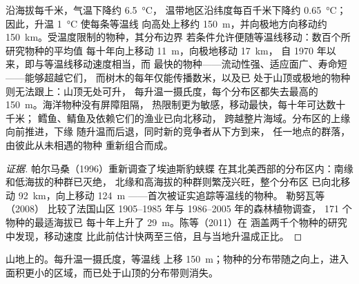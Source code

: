 \begin{proposition}\label{prop:b2:global-change:range}
沿海拔每千米，气温下降约 \qty{6.5}{\celsius}，
温带地区沿纬度每百千米下降约 \qty{0.65}{\celsius}；
因此，升温 \qty{1}{\celsius} 使每条等温线
向高处上移约 \qty{150}{m}，并向极地方向移动约
\qty{150}{km}。受温度限制的物种，其分布边界
若条件允许便随等温线移动：数百个所研究物种的平均值
每十年向上移动 \qty{11}{m}，向极地移动 \qty{17}{km}，
自 1970 年以来，即与等温线移动速度相当，而
最快的物种——流动性强、适应面广、寿命短——能够超越它们，
而树木的每年仅能传播数米，以及已
处于山顶或极地的物种则无法跟上：山顶无处可升，
每升温一摄氏度，每个分布区都失去最高的
\qty{150}{m}。海洋物种没有屏障阻隔，
热限制更为敏感，移动最快，每十年可达数十千米；
鳕鱼、鲭鱼及依赖它们的渔业已向北移动，
跨越整片海域。分布区的上缘向前推进，下缘
随升温而后退，同时新的竞争者从下方到来，
任一地点的群落，由彼此从未相遇的物种
重新组合而成。
\end{proposition}
\begin{proof}[证据]
帕尔马桑（1996）重新调查了埃迪斯豹蛱蝶
在其北美西部的分布区内：南缘和低海拔的种群已灭绝，
北缘和高海拔的种群则繁茂兴旺，整个分布区
已向北移动 \qty{92}{km}，向上移动 \qty{124}{m}
——首次被证实追踪等温线的物种。
勒努瓦等（2008）
比较了法国山区 1905--1985 年与 1986--2005 年的森林植物调查，
171 个物种的最适海拔已
每十年上升了 \qty{29}{m}。陈等（2011）在
涵盖两千个物种的研究中发现，移动速度
比此前估计快两至三倍，且与当地升温成正比。
\end{proof}

\begin{omfigure}

{\small 山地上的。每升温一摄氏度，等温线
上移 \qty{150}{m}；物种的分布带随之向上，进入
面积更小的区域，而已处于山顶的分布带则消失。}
\end{omfigure}


